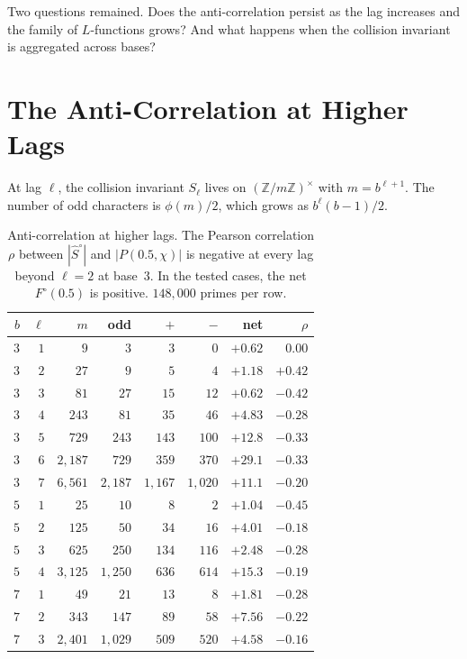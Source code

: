\documentclass[12pt]{amsart}
\theoremstyle{definition}
\theoremstyle{remark}
\begin{document}
Two questions remained. Does the anti-correlation
persist as the lag increases and the family of
$L$-functions grows? And what happens when the
collision invariant is aggregated across bases?

\section{The Anti-Correlation at Higher Lags}

At lag $\ell$, the collision invariant $S_{\ell}$ lives
on $(\mathbb{Z}/m\mathbb{Z})^{\times}$ with
$m = b^{\ell+1}$. The number of odd characters is
$\phi(m)/2$, which grows as $b^{\ell}(b{-}1)/2$.

\begin{table}[h]
\centering
\begin{tabular}{rrrrrrrr}
\toprule
$b$ & $\ell$ & $m$ & odd & $+$ & $-$ &
net & $\rho$ \\
\midrule
$3$ & $1$ & $9$ & $3$ & $3$ & $0$ &
$+0.62$ & $0.00$ \\
$3$ & $2$ & $27$ & $9$ & $5$ & $4$ &
$+1.18$ & $+0.42$ \\
$3$ & $3$ & $81$ & $27$ & $15$ & $12$ &
$+0.62$ & $-0.42$ \\
$3$ & $4$ & $243$ & $81$ & $35$ & $46$ &
$+4.83$ & $-0.28$ \\
$3$ & $5$ & $729$ & $243$ & $143$ & $100$ &
$+12.8$ & $-0.33$ \\
$3$ & $6$ & $2{,}187$ & $729$ & $359$ & $370$ &
$+29.1$ & $-0.33$ \\
$3$ & $7$ & $6{,}561$ & $2{,}187$ & $1{,}167$ & $1{,}020$ &
$+11.1$ & $-0.20$ \\
\midrule
$5$ & $1$ & $25$ & $10$ & $8$ & $2$ &
$+1.04$ & $-0.45$ \\
$5$ & $2$ & $125$ & $50$ & $34$ & $16$ &
$+4.01$ & $-0.18$ \\
$5$ & $3$ & $625$ & $250$ & $134$ & $116$ &
$+2.48$ & $-0.28$ \\
$5$ & $4$ & $3{,}125$ & $1{,}250$ & $636$ & $614$ &
$+15.3$ & $-0.19$ \\
\midrule
$7$ & $1$ & $49$ & $21$ & $13$ & $8$ &
$+1.81$ & $-0.28$ \\
$7$ & $2$ & $343$ & $147$ & $89$ & $58$ &
$+7.56$ & $-0.22$ \\
$7$ & $3$ & $2{,}401$ & $1{,}029$ & $509$ & $520$ &
$+4.58$ & $-0.16$ \\
\bottomrule
\end{tabular}
\caption{Anti-correlation at higher lags. The Pearson
correlation $\rho$ between $|\hat{S}^{\circ}|$ and
$|P(0.5, \chi)|$ is negative at every lag beyond
$\ell = 2$ at base~$3$. In the tested cases, the net $F^{\circ}(0.5)$ is
positive. $148{,}000$ primes per row.}
\label{tab:lags}
\end{table}
\end{document}
